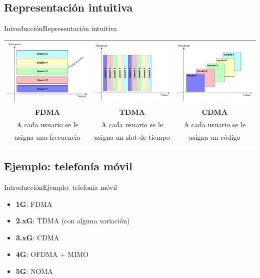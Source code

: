 \documentclass[10pt,compress]{beamer} %
\begin{document}
\subsection{Representación intuitiva}
\begin{frame}{Introducción}{Representación intuitiva}
  \begin{tabular}{ccc}
    \includegraphics[width=0.3\linewidth]{../Apuntes/Figuras/FDMA.pdf} & 
    \includegraphics[width=0.3\linewidth]{../Apuntes/Figuras/TDMA.pdf} & 
    \includegraphics[width=0.3\linewidth]{../Apuntes/Figuras/CDMA.pdf} \\
    {\bf FDMA} & {\bf TDMA} & {\bf CDMA} \\
    A cada usuario se le   & A cada usuario se le & A cada usuario se le \\
    asigna una frecuencia & asigna un slot de tiempo & asigna un código\\
  \end{tabular}

\end{frame}

\subsection{Ejemplo: telefonía móvil}
\begin{frame}{Introducción}{Ejemplo: telefonía móvil}
  \begin{itemize}
    \item {\bf 1G}: FDMA
    \item {\bf 2.xG}: TDMA (con alguna variación)
    \item {\bf 3.xG}: CDMA
    \item {\bf 4G}: OFDMA + MIMO
    \item {\bf 5G}: NOMA
  \end{itemize}
\end{frame}
\end{document}
